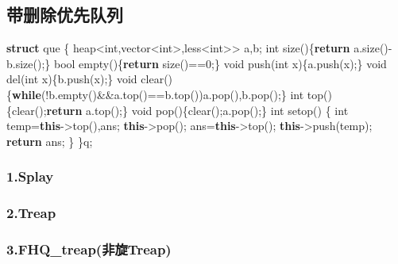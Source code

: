 \documentclass[
]{article}
\newenvironment{Shaded}{}{}
\newcommand{\ControlFlowTok}[1]{\textcolor[rgb]{0.00,0.44,0.13}{\textbf{#1}}}
\newcommand{\DataTypeTok}[1]{\textcolor[rgb]{0.56,0.13,0.00}{#1}}
\newcommand{\DecValTok}[1]{\textcolor[rgb]{0.25,0.63,0.44}{#1}}
\newcommand{\KeywordTok}[1]{\textcolor[rgb]{0.00,0.44,0.13}{\textbf{#1}}}
\newcommand{\NormalTok}[1]{#1}
\begin{document}
\hypertarget{ux5e26ux5220ux9664ux4f18ux5148ux961fux5217}{%
\subsection{带删除优先队列}\label{ux5e26ux5220ux9664ux4f18ux5148ux961fux5217}}

\begin{Shaded}
\begin{Highlighting}[]
\KeywordTok{struct}\NormalTok{ que}
\NormalTok{\{}
\NormalTok{    heap\textless{}}\DataTypeTok{int}\NormalTok{,vector\textless{}}\DataTypeTok{int}\NormalTok{\textgreater{},less\textless{}}\DataTypeTok{int}\NormalTok{\textgreater{}\textgreater{} a,b;}
    \DataTypeTok{int}\NormalTok{ size()\{}\ControlFlowTok{return}\NormalTok{ a.size(){-}b.size();\}}
    \DataTypeTok{bool}\NormalTok{ empty()\{}\ControlFlowTok{return}\NormalTok{ size()==}\DecValTok{0}\NormalTok{;\}}
    \DataTypeTok{void}\NormalTok{ push(}\DataTypeTok{int}\NormalTok{ x)\{a.push(x);\}}
    \DataTypeTok{void}\NormalTok{ del(}\DataTypeTok{int}\NormalTok{ x)\{b.push(x);\}}
    \DataTypeTok{void}\NormalTok{ clear()\{}\ControlFlowTok{while}\NormalTok{(!b.empty()\&\&a.top()==b.top())a.pop(),b.pop();\}}
    \DataTypeTok{int}\NormalTok{ top()\{clear();}\ControlFlowTok{return}\NormalTok{ a.top();\}}
    \DataTypeTok{void}\NormalTok{ pop()\{clear();a.pop();\}}
    \DataTypeTok{int}\NormalTok{ setop()}
\NormalTok{    \{}
        \DataTypeTok{int}\NormalTok{ temp=}\KeywordTok{this}\NormalTok{{-}\textgreater{}top(),ans; }\KeywordTok{this}\NormalTok{{-}\textgreater{}pop();}
\NormalTok{        ans=}\KeywordTok{this}\NormalTok{{-}\textgreater{}top(); }\KeywordTok{this}\NormalTok{{-}\textgreater{}push(temp);}
        \ControlFlowTok{return}\NormalTok{ ans;}
\NormalTok{    \}}
\NormalTok{\}q;}
\end{Highlighting}
\end{Shaded}

\hypertarget{splay}{%
\subsubsection{1.Splay}\label{splay}}

\hypertarget{treap}{%
\subsubsection{2.Treap}\label{treap}}

\hypertarget{fhq_treapux975eux65cbtreap}{%
\subsubsection{3.FHQ\_treap(非旋Treap)}\label{fhq_treapux975eux65cbtreap}}
\end{document}
